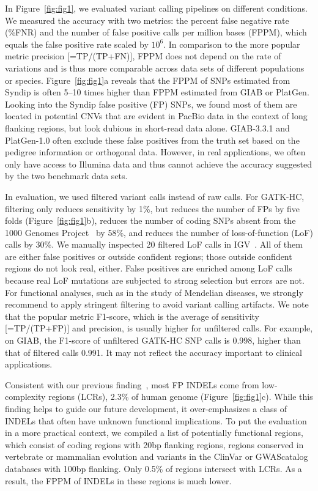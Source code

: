 \documentclass{bioinfo}
\begin{document}
In Figure~\ref{fig:fig1}, we evaluated variant calling pipelines on different
conditions. We measured the accuracy with two metrics: the percent false
negative rate (\%FNR) and the number of false positive calls per million bases
(FPPM), which equals the false positive rate scaled by $10^6$. In comparison to
the more popular metric precision [=TP/(TP+FN)], FPPM does not depend on the
rate of variations and is thus more comparable across data sets of different
populations or species. Figure~\ref{fig:fig1}a reveals that the FPPM of SNPs
estimated from Syndip is often 5--10 times higher than FPPM estimated from
GIAB or PlatGen.  Looking into the Syndip false positive (FP) SNPs, we found
most of them are located in potential CNVs that are evident in PacBio data in
the context of long flanking regions, but look dubious in short-read data
alone. GIAB-3.3.1 and PlatGen-1.0 often exclude these false positives from the truth set
based on the pedigree information or orthogonal data.  However, in real
applications, we often only have access to Illumina data and thus cannot
achieve the accuracy suggested by the two benchmark data sets.

In evaluation, we used filtered variant calls instead of raw calls. For
GATK-HC, filtering only reduces sensitivity by 1\%, but reduces the number of FPs by
five folds (Figure~\ref{fig:fig1}b), reduces the number of coding SNPs absent
from the 1000 Genomes Project~\citep{1000-Genomes-Project-Consortium:2015aa} by
58\%, and reduces the number of loss-of-function (LoF) calls by 30\%. We
manually inspected 20 filtered LoF calls in
IGV~\citep{Robinson:2011uo}. All of them are either false positives or outside
confident regions; those outside confident regions do not look real, either.
False positives are enriched among LoF calls because real LoF mutations are
subjected to strong selection but errors are not. For functional analyses, such
as in the study of Mendelian diseases, we strongly recommend to apply stringent
filtering to avoid variant calling artifacts. We note that the popular metric
F1-score, which is the average of sensitivity [=TP/(TP+FP)] and precision, is usually higher for unfiltered calls. For example, on GIAB,
the F1-score of unfiltered GATK-HC SNP calls is 0.998, higher than that of
filtered calls 0.991. It may not reflect the accuracy important to clinical
applications.

Consistent with our previous finding~\citep{Li:2014ac}, most FP INDELs come
from low-complexity regions (LCRs), 2.3\% of human genome
(Figure~\ref{fig:fig1}c). While this finding helps to guide our future
development, it over-emphasizes a class of INDELs that often have unknown
functional implications. To put the evaluation in a more practical context,
we compiled a list of potentially functional regions, which consist of coding
regions with 20bp flanking regions, regions conserved in vertebrate or
mammalian evolution and variants in the ClinVar or GWAScatalog databases with
100bp flanking. Only 0.5\% of regions intersect with LCRs. As a result, the
FPPM of INDELs in these regions is much lower.
\end{document}
